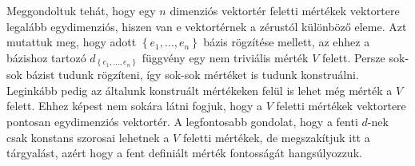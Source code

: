 \documentclass[a4paper, showtrims]{memoir}
\theoremstyle{plain}
\theoremstyle{remark}
\theoremstyle{definition}
\begin{document}
Meggondoltuk tehát,
hogy egy $n$ dimenziós vektortér feletti mértékek vektortere legalább egydimenziós,
hiszen van e vektortérnek a zérustól különböző eleme.
Azt mutattuk meg, hogy
adott $\left\{ e_1,\ldots,e_n \right\}$ bázis rögzítése mellett,
az ehhez a bázishoz tartozó $d_{\left\{ e_1,\ldots,e_n \right\}}$ függvény egy nem triviális mérték $V$ felett.
Persze sok-sok bázist tudunk rögzíteni, így sok-sok mértéket is tudunk konstruálni.
Leginkább pedig az általunk konstruált mértékeken felül is lehet még mérték a $V$ felett.
Ehhez képest nem sokára látni fogjuk,
hogy a $V$ feletti mértékek vektortere pontosan egydimenziós vektortér.
A legfontosabb gondolat, hogy a fenti $d$-nek csak konstans szorosai lehetnek a $V$ feletti mértékek,
de megszakítjuk itt a tárgyalást, azért hogy a fent definiált mérték fontosságát hangsúlyozzuk.
\end{document}
